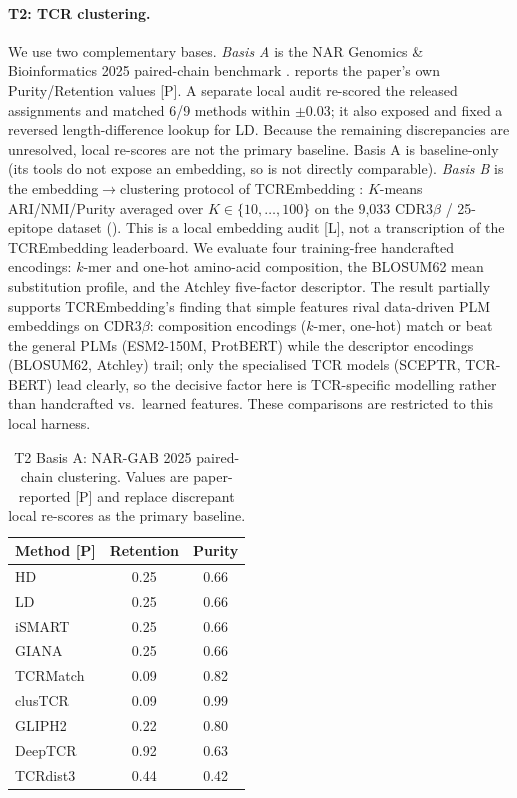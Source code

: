 \paragraph{T2: TCR clustering.}
We use two complementary bases. \emph{Basis A} is the NAR Genomics \&
Bioinformatics 2025 paired-chain benchmark \citep{nargab2025tcrcluster}.
 reports the paper's own Purity/Retention values [P]. A
separate local audit re-scored the released assignments and matched 6/9 methods
within $\pm0.03$; it also exposed and fixed a reversed length-difference lookup
for LD. Because the remaining discrepancies are unresolved, local re-scores are
not the primary baseline. Basis A is baseline-only (its tools do not expose an
embedding, so \Ours{} is not directly comparable).
\emph{Basis B} is the embedding$\rightarrow$clustering protocol of TCREmbedding
\citep{feng2025tcrembedding}: $K$-means ARI/NMI/Purity averaged over
$K\in\{10,\dots,100\}$ on the 9{,}033 CDR3$\beta$ / 25-epitope dataset
(). This is a local embedding audit [L], not a transcription of
the TCREmbedding leaderboard. We evaluate four training-free handcrafted encodings:
$k$-mer and one-hot amino-acid composition, the BLOSUM62 mean substitution
profile, and the Atchley five-factor descriptor. The result partially supports
TCREmbedding's finding that simple features rival data-driven PLM embeddings on
CDR3$\beta$: composition encodings ($k$-mer, one-hot) match or beat the general
PLMs (ESM2-150M, ProtBERT) while the descriptor encodings (BLOSUM62, Atchley)
trail; only the specialised TCR models (SCEPTR, TCR-BERT) lead clearly, so the
decisive factor here is TCR-specific modelling rather than handcrafted vs.\
learned features. These comparisons are restricted to this local harness.

\begin{table}[t]
\centering
\caption{T2 Basis A: NAR-GAB 2025 paired-chain clustering. Values are
paper-reported [P] and replace discrepant local re-scores as the primary
baseline.}
\label{tab:t2-nargab}
\small
\begin{tabular}{@{}lcc@{}}
\toprule
Method [P] & Retention & Purity \\
\midrule
HD        & 0.25 & 0.66 \\
LD        & 0.25 & 0.66 \\
iSMART    & 0.25 & 0.66 \\
GIANA     & 0.25 & 0.66 \\
TCRMatch  & 0.09 & 0.82 \\
clusTCR   & 0.09 & 0.99 \\
GLIPH2    & 0.22 & 0.80 \\
DeepTCR   & 0.92 & 0.63 \\
TCRdist3  & 0.44 & 0.42 \\
\bottomrule
\end{tabular}
\end{table}

